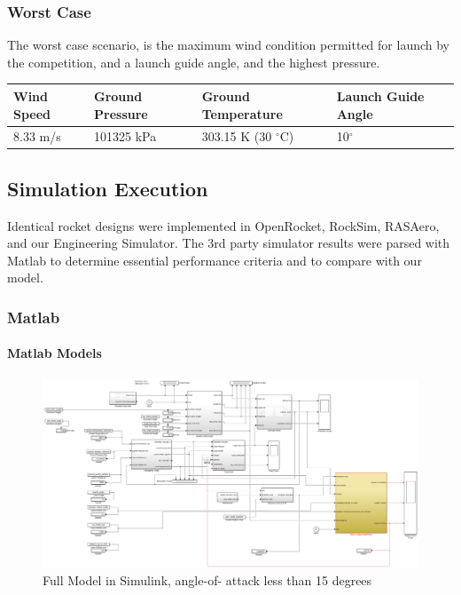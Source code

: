 \documentclass[]{article}
\let\oldparagraph\paragraph
\renewcommand{\paragraph}[1]{\oldparagraph{#1}\mbox{}}
\begin{document}

\subsubsection{Worst Case}\label{worst-case}

The worst case scenario, is the maximum wind condition permitted for
launch by the competition, and a launch guide angle, and the highest
pressure.

\begin{longtable}[c]{@{}llll@{}}
\toprule
Wind Speed & Ground Pressure & Ground Temperature & Launch Guide
Angle\tabularnewline
\midrule
\endhead
8.33 m/s & 101325 kPa & 303.15 K (30 \(^\circ\)C) &
10\(^\circ\)\tabularnewline
\bottomrule
\end{longtable}


\clearpage

\subsection{Simulation Execution}\label{simulation-execution-1}

Identical rocket designs were implemented in OpenRocket, RockSim,
RASAero, and our Engineering Simulator. The 3rd party simulator results
were parsed with Matlab to determine essential performance criteria and
to compare with our model.

\clearpage

\subsubsection{Matlab}\label{matlab}

\paragraph{Matlab Models}\label{matlab-models}

\begin{figure}[htbp]
\centering
\includegraphics{images/rocket_model.png}
\caption{Full Model in Simulink, angle-of- attack less than 15 degrees
\label{full_model_test_label}}
\end{figure}
\end{document}
